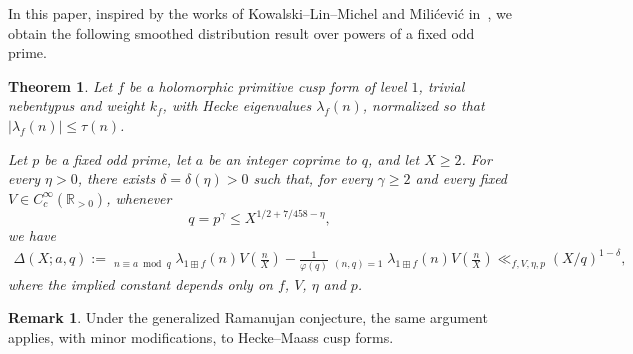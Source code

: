 \documentclass[11pt,reqno]{amsart}
\numberwithin{equation}{section}
\theoremstyle{plain}
\newtheorem{theorem}[lemma]{Theorem}
\theoremstyle{definition}
\newtheorem{remark}{Remark}
\begin{document}
In this paper, inspired by the works of Kowalski--Lin--Michel \cite{KLM} and Mili\'{c}evi\'{c} in~\cite{MD}, 
we obtain the following smoothed distribution result over powers of a fixed odd prime.
\begin{theorem}\label{Main theorem}
Let $f$ be a holomorphic primitive cusp form of level $1$,
trivial nebentypus and weight $k_f$,
with Hecke eigenvalues $\lambda_f(n)$,
normalized so that $|\lambda_f(n)|\leq \tau(n)$.

Let $p$ be a fixed odd prime, let $a$ be an integer coprime to $q$,
and let $X\geq 2$. For every $\eta>0$, there exists
$\delta=\delta(\eta)>0$ such that, for every $\gamma\geq2$ and every
fixed $V\in C_c^\infty(\mathbb R_{>0})$, whenever
\[
q=p^\gamma\leq X^{1/2+7/458-\eta},
\]
we have
\begin{equation}\label{main result}
\begin{split}
\Delta(X;a,q):=\mathop{\sum_{n\geq1}}_{n\equiv a\bmod q}
\lambda_{1\boxplus f}(n)V\left(\frac{n}{X}\right)
-\frac{1}{\varphi(q)} \mathop{\sum_{n\geq 1}}_{(n,q)=1}
\lambda_{1\boxplus f}(n)V\left(\frac{n}{X}\right)\ll_{f, V, \eta, p} (X/q)^{1-\delta},
\end{split}
\end{equation}
where the implied constant depends only on $f$, $V$, $\eta$ and $p$.


\end{theorem}

\begin{remark}
Under the generalized Ramanujan conjecture, the same argument applies, with minor modifications, to Hecke--Maass cusp forms.
\end{remark}
\end{document}
